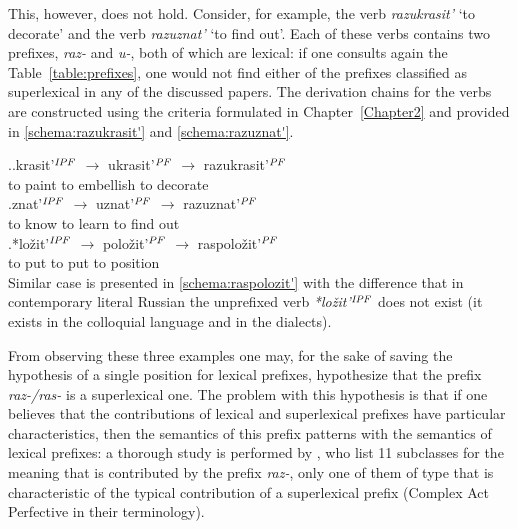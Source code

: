 This, however, does not hold. Consider, for example, the verb \textit{razukrasit'} `to decorate' and the verb \textit{razuznat'} `to find out'. Each of these verbs contains two prefixes, \textit{raz-} and \textit{u-}, both of which are lexical: if one consults again the Table~\ref{table:prefixes}, one would not find either of the prefixes classified as superlexical in any of the discussed papers. The derivation chains for the verbs are constructed using the criteria formulated in Chapter~\ref{Chapter2} and provided in \ref{schema:razukrasit'} and \ref{schema:razuznat'}.

\ex.\ag.\label{schema:razukrasit'}krasit'$^{\mathit{IPF}}$ {$\rightarrow$} ukrasit'$^{\mathit{PF}}$ {$\rightarrow$} razukrasit'$^{\mathit{PF}}$\\
{to paint} {} {to embellish} {} {to decorate}\\
\bg.\label{schema:razuznat'}znat'$^{\mathit{IPF}}$ {$\rightarrow$} uznat'$^{\mathit{PF}}$ {$\rightarrow$} razuznat'$^{\mathit{PF}}$\\
{to know} {} {to learn} {} {to find out}\\
\bg.*lo\v{z}it'$^{\mathit{IPF}}$ {$\rightarrow$} polo\v{z}it'$^{\mathit{PF}}$ {$\rightarrow$} raspolo\v{z}it'$^{\mathit{PF}}$\label{schema:raspolozit'}\\
{to put} {} {to put} {} {to position}\\

Similar case is presented in \ref{schema:raspolozit'}
with the difference that in contemporary literal Russian the unprefixed verb \textit{*lo\v{z}it'$^{\mathit{IPF}}$} does not exist (it exists in the colloquial language and in the dialects). 

From observing these three examples one may, for the sake of saving the hypothesis of a single position for lexical prefixes, hypothesize that the prefix \textit{raz-/ras-} is a superlexical one. The problem with this hypothesis is that if one believes that the contributions of lexical and superlexical prefixes have particular characteristics, then the semantics of this prefix patterns with the semantics of lexical prefixes: a thorough study is performed by \citet{JandaNesset:10}, who list 11 subclasses for the meaning that is contributed by the prefix \textit{raz-}, only one of them of  type that is characteristic of the typical contribution of a superlexical prefix (Complex Act Perfective in their terminology).


